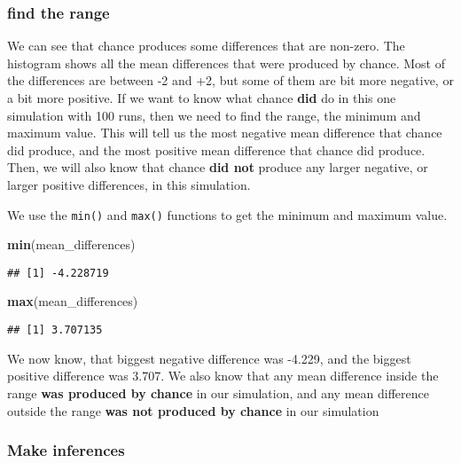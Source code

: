 \documentclass[
]{book}
\newenvironment{Shaded}{\begin{snugshade}}{\end{snugshade}}
\newcommand{\FunctionTok}[1]{\textcolor[rgb]{0.13,0.29,0.53}{\textbf{#1}}}
\newcommand{\NormalTok}[1]{#1}
\begin{document}
\hypertarget{find-the-range}{%
\subsubsection{find the range}\label{find-the-range}}

We can see that chance produces some differences that are non-zero. The histogram shows all the mean differences that were produced by chance. Most of the differences are between -2 and +2, but some of them are bit more negative, or a bit more positive. If we want to know what chance \textbf{did} do in this one simulation with 100 runs, then we need to find the range, the minimum and maximum value. This will tell us the most negative mean difference that chance did produce, and the most positive mean difference that chance did produce. Then, we will also know that chance \textbf{did not} produce any larger negative, or larger positive differences, in this simulation.

We use the \texttt{min()} and \texttt{max()} functions to get the minimum and maximum value.

\begin{Shaded}
\begin{Highlighting}[]
\FunctionTok{min}\NormalTok{(mean\_differences)}
\end{Highlighting}
\end{Shaded}

\begin{verbatim}
## [1] -4.228719
\end{verbatim}

\begin{Shaded}
\begin{Highlighting}[]
\FunctionTok{max}\NormalTok{(mean\_differences)}
\end{Highlighting}
\end{Shaded}

\begin{verbatim}
## [1] 3.707135
\end{verbatim}

We now know, that biggest negative difference was -4.229, and the biggest positive difference was 3.707. We also know that any mean difference inside the range \textbf{was produced by chance} in our simulation, and any mean difference outside the range \textbf{was not produced by chance} in our simulation

\hypertarget{make-inferences}{%
\subsubsection{Make inferences}\label{make-inferences}}
\end{document}
